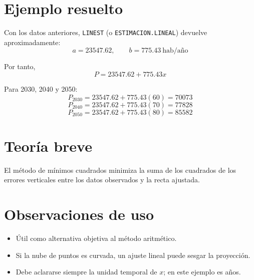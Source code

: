 \documentclass[12pt]{article}
\begin{document}
\section{Ejemplo resuelto}
Con los datos anteriores, \texttt{LINEST} (o \texttt{ESTIMACION.LINEAL}) devuelve aproximadamente:
\[
a=\num{23547.62},\qquad b=\num{775.43}\ \text{hab/año}
\]

Por tanto,
\[
P = \num{23547.62} + \num{775.43}x
\]

Para 2030, 2040 y 2050:
\[
P_{2030}=\num{23547.62}+\num{775.43}(60)=\num{70073}
\]
\[
P_{2040}=\num{23547.62}+\num{775.43}(70)=\num{77828}
\]
\[
P_{2050}=\num{23547.62}+\num{775.43}(80)=\num{85582}
\]


\section{Teoría breve}
El método de mínimos cuadrados minimiza la suma de los cuadrados de los errores verticales entre los datos observados y la recta ajustada.

\section{Observaciones de uso}
\begin{itemize}
\item Útil como alternativa objetiva al método aritmético.
\item Si la nube de puntos es curvada, un ajuste lineal puede sesgar la proyección.
\item Debe aclararse siempre la unidad temporal de $x$; en este ejemplo es años.
\end{itemize}
\end{document}

